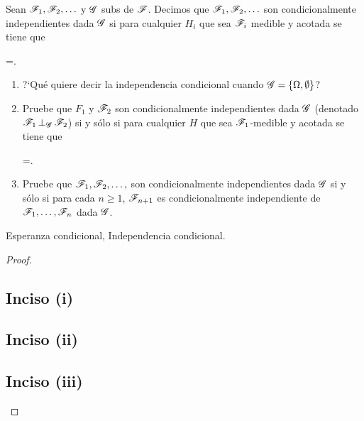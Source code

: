 \begin{problema}
	Sean $\mathscr{F}_1,\mathscr{F}_2,\ldots $ y $\mathscr{G}$ sub\sa s de $\mathscr{F}$. 
	Decimos que $\mathscr{F}_1,\mathscr{F}_2,\ldots$ son condicionalmente independientes dada $\mathscr{G}$ si para 
	cualquier $H_i$ que sea $\mathscr{F}_i$ medible y acotada se tiene que
	
	\begin{esn}
		=\cdots {}.
	\end{esn}
	
	\begin{enumerate}
		\item[(i)]	[\ref{problema4_1:inciso1}]
			?`Qu\'e quiere decir la independencia condicional cuando $\mathscr{G}=\left\{  \Omega ,\emptyset\right\} $?
			\pn

		\item[(ii)] 	[\ref{problema4_1:inciso2}]
			Pruebe que $F_1$ y $\mathscr{F}_2$ son condicionalmente independientes dada $\mathscr{G}$ 
			(denotado $\condind{\F_1}{\F_2}{\G}$) si y s\'olo si para 
			cualquier $H$ que sea $\mathscr{F}_1$-medible y acotada se tiene que
			\begin{esn}
				=\espc{H}{\G}.
			\end{esn}

		\item[(iii)]	[\ref{problema4_1:inciso3}]
			Pruebe que $\mathscr{F}_1,\mathscr{F}_2,\ldots, $ son condicionalmente independientes dada 
			$\mathscr{G}$ si y s\'olo si para cada $n\geq 1$, $\mathscr{F}_{n+1}$ es condicionalmente 
			independiente de $\mathscr{F}_1,\ldots, \mathscr{F}_n$ dada $\mathscr{G}$. 
	\end{enumerate}

	 Esperanza condicional, Independencia condicional.
\end{problema}

\begin{proof}
    \subsection{Inciso (i)} \label{problema4_1:inciso1}
    
    \newpage

    \subsection{Inciso (ii)} \label{problema4_1:inciso2}
    
    \newpage

    \subsection{Inciso (iii)} \label{problema4_1:inciso3}
    
\end{proof}